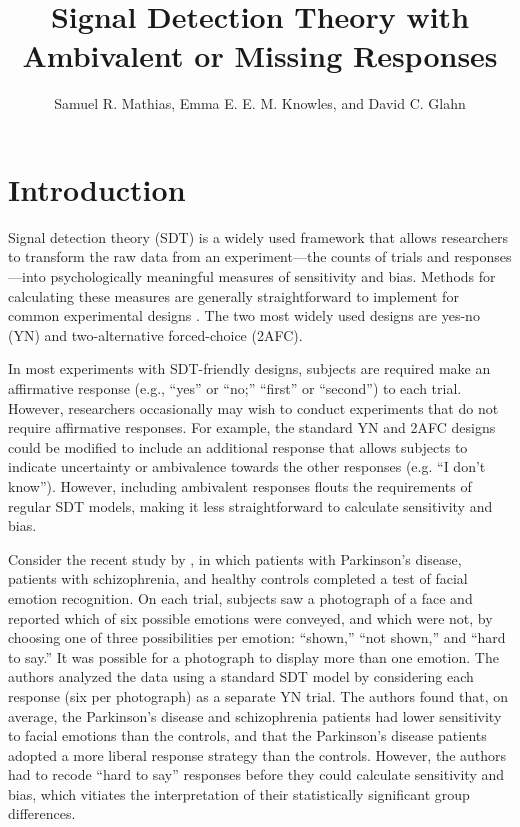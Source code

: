 \documentclass[man]{apa6}
\title{Signal Detection Theory with Ambivalent or Missing Responses}
\author{Samuel R. Mathias, Emma E. E. M. Knowles, and David C. Glahn}
\affiliation{Yale University}
\begin{document}
\maketitle

\section{Introduction}
Signal detection theory (SDT) is a widely used framework that allows researchers to transform the raw data from an experiment---the counts of trials and responses---into psychologically meaningful measures of sensitivity and bias. Methods for calculating these measures are generally straightforward to implement for common experimental designs \parencite[see][]{Green1966, Macmillan2005}. The two most widely used designs are yes-no (YN) and two-alternative forced-choice (2AFC).

In most experiments with SDT-friendly designs, subjects are required make an affirmative response (e.g., ``yes'' or ``no;'' ``first'' or ``second'') to each trial. However, researchers occasionally may wish to conduct experiments that do not require affirmative responses. For example, the standard YN and 2AFC designs could be modified to include an additional response that allows subjects to indicate uncertainty or ambivalence towards the other responses (e.g. ``I don't know''). However, including ambivalent responses flouts the requirements of regular SDT models, making it less straightforward to calculate sensitivity and bias.

Consider the recent study by \textcite{laskowskaemotional2015}, in which patients with Parkinson's disease, patients with schizophrenia, and healthy controls completed a test of facial emotion recognition. On each trial, subjects saw a photograph of a face and reported which of six possible emotions were conveyed, and which were not, by choosing one of three possibilities per emotion: ``shown,'' ``not shown,'' and ``hard to say.'' It was possible for a photograph to display more than one emotion. The authors analyzed the data using a standard SDT model by considering each response (six per photograph) as a separate YN trial. The authors found that, on average, the Parkinson's disease and schizophrenia patients had lower sensitivity to facial emotions than the controls, and that the Parkinson's disease patients adopted a more liberal response strategy than the controls. However, the authors had to recode ``hard to say'' responses before they could calculate sensitivity and bias, which vitiates the interpretation of their statistically significant group differences.
\end{document}
